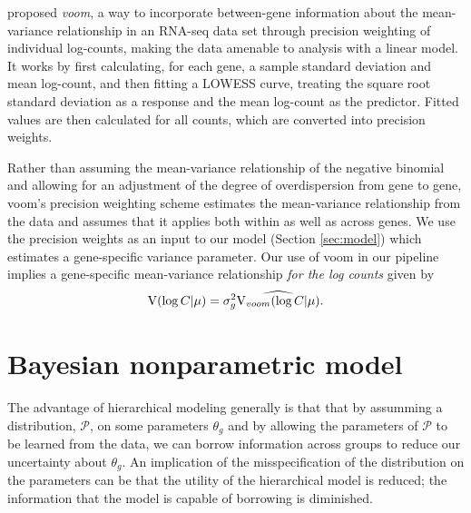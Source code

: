 \cite{voom} proposed \textit{voom}, a way to incorporate between-gene information about the mean-variance relationship in an RNA-seq data set through precision weighting of individual log-counts, making the data amenable to analysis with a linear model. It works by first calculating, for each gene, a sample standard deviation and mean log-count, and then fitting a LOWESS curve, treating the square root standard deviation as a response and the mean log-count as the predictor. Fitted values are then calculated for all counts, which are converted into precision weights.

Rather than assuming the mean-variance relationship of the negative binomial and allowing for an adjustment of the degree of overdispersion from gene to gene, voom's precision weighting scheme estimates the mean-variance relationship from the data and assumes that it applies both within as well as across genes. We use the precision weights as an input to our model (Section \ref{sec:model}) which estimates a gene-specific variance parameter. Our use of voom in our pipeline implies a gene-specific mean-variance relationship \textit{for the log counts} given by
$$\operatorname{V}(\log C|\mu)=\sigma^2_g \widehat{\operatorname{V}_{voom}(\log C|\mu)}.$$



\section{Bayesian nonparametric model}
The advantage of hierarchical modeling generally is that that by assumming a distribution, $\mathcal{P}$, on some parameters $\theta_g$ and by allowing the parameters of $\mathcal{P}$ to be learned from the data, we can borrow information across groups to reduce our uncertainty about $\theta_g$. An implication of the misspecification of the distribution on the parameters can be that the utility of the hierarchical model is reduced; the information that the model is capable of borrowing is diminished.


